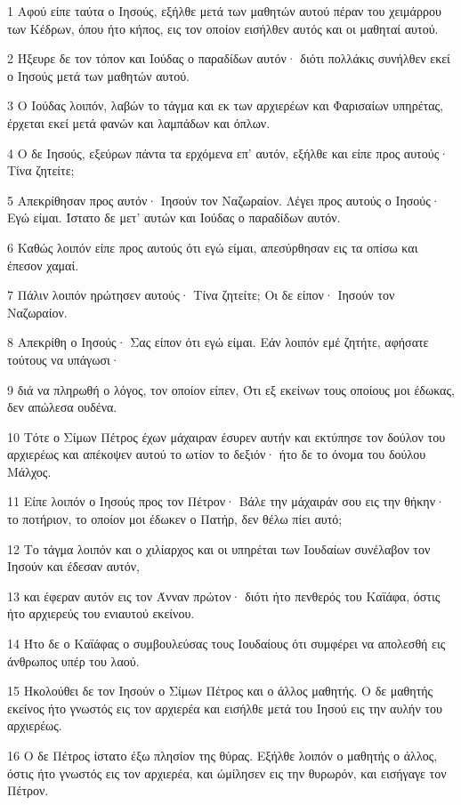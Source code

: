 \par 1 Αφού είπε ταύτα ο Ιησούς, εξήλθε μετά των μαθητών αυτού πέραν του χειμάρρου των Κέδρων, όπου ήτο κήπος, εις τον οποίον εισήλθεν αυτός και οι μαθηταί αυτού.
\par 2 Ήξευρε δε τον τόπον και Ιούδας ο παραδίδων αυτόν· διότι πολλάκις συνήλθεν εκεί ο Ιησούς μετά των μαθητών αυτού.
\par 3 Ο Ιούδας λοιπόν, λαβών το τάγμα και εκ των αρχιερέων και Φαρισαίων υπηρέτας, έρχεται εκεί μετά φανών και λαμπάδων και όπλων.
\par 4 Ο δε Ιησούς, εξεύρων πάντα τα ερχόμενα επ' αυτόν, εξήλθε και είπε προς αυτούς· Τίνα ζητείτε;
\par 5 Απεκρίθησαν προς αυτόν· Ιησούν τον Ναζωραίον. Λέγει προς αυτούς ο Ιησούς· Εγώ είμαι. Ίστατο δε μετ' αυτών και Ιούδας ο παραδίδων αυτόν.
\par 6 Καθώς λοιπόν είπε προς αυτούς ότι εγώ είμαι, απεσύρθησαν εις τα οπίσω και έπεσον χαμαί.
\par 7 Πάλιν λοιπόν ηρώτησεν αυτούς· Τίνα ζητείτε; Οι δε είπον· Ιησούν τον Ναζωραίον.
\par 8 Απεκρίθη ο Ιησούς· Σας είπον ότι εγώ είμαι. Εάν λοιπόν εμέ ζητήτε, αφήσατε τούτους να υπάγωσι·
\par 9 διά να πληρωθή ο λόγος, τον οποίον είπεν, Ότι εξ εκείνων τους οποίους μοι έδωκας, δεν απώλεσα ουδένα.
\par 10 Τότε ο Σίμων Πέτρος έχων μάχαιραν έσυρεν αυτήν και εκτύπησε τον δούλον του αρχιερέως και απέκοψεν αυτού το ωτίον το δεξιόν· ήτο δε το όνομα του δούλου Μάλχος.
\par 11 Είπε λοιπόν ο Ιησούς προς τον Πέτρον· Βάλε την μάχαιράν σου εις την θήκην· το ποτήριον, το οποίον μοι έδωκεν ο Πατήρ, δεν θέλω πίει αυτό;
\par 12 Το τάγμα λοιπόν και ο χιλίαρχος και οι υπηρέται των Ιουδαίων συνέλαβον τον Ιησούν και έδεσαν αυτόν,
\par 13 και έφεραν αυτόν εις τον Άνναν πρώτον· διότι ήτο πενθερός του Καϊάφα, όστις ήτο αρχιερεύς του ενιαυτού εκείνου.
\par 14 Ήτο δε ο Καϊάφας ο συμβουλεύσας τους Ιουδαίους ότι συμφέρει να απολεσθή εις άνθρωπος υπέρ του λαού.
\par 15 Ηκολούθει δε τον Ιησούν ο Σίμων Πέτρος και ο άλλος μαθητής. Ο δε μαθητής εκείνος ήτο γνωστός εις τον αρχιερέα και εισήλθε μετά του Ιησού εις την αυλήν του αρχιερέως.
\par 16 Ο δε Πέτρος ίστατο έξω πλησίον της θύρας. Εξήλθε λοιπόν ο μαθητής ο άλλος, όστις ήτο γνωστός εις τον αρχιερέα, και ώμίλησεν εις την θυρωρόν, και εισήγαγε τον Πέτρον.
